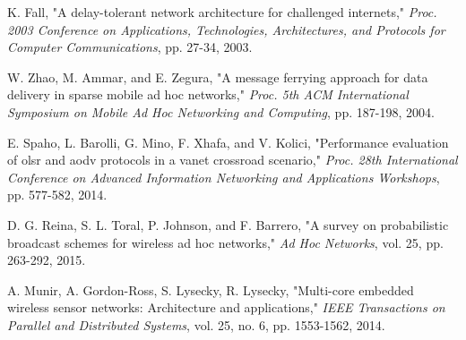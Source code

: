 \documentclass[conference]{IEEEtran}
\begin{document}
\begin{thebibliography}{00}
 K. Fall, "A delay-tolerant network architecture for challenged internets," \textit{Proc. 2003 Conference on Applications, Technologies, Architectures, and Protocols for Computer Communications}, pp. 27-34, 2003.

 W. Zhao, M. Ammar, and E. Zegura, "A message ferrying approach for data delivery in sparse mobile ad hoc networks," \textit{Proc. 5th ACM International Symposium on Mobile Ad Hoc Networking and Computing}, pp. 187-198, 2004.

 E. Spaho, L. Barolli, G. Mino, F. Xhafa, and V. Kolici, "Performance evaluation of olsr and aodv protocols in a vanet crossroad scenario," \textit{Proc. 28th International Conference on Advanced Information Networking and Applications Workshops}, pp. 577-582, 2014.

 D. G. Reina, S. L. Toral, P. Johnson, and F. Barrero, "A survey on probabilistic broadcast schemes for wireless ad hoc networks," \textit{Ad Hoc Networks}, vol. 25, pp. 263-292, 2015.

 A. Munir, A. Gordon-Ross, S. Lysecky, R. Lysecky, "Multi-core embedded wireless sensor networks: Architecture and applications," \textit{IEEE Transactions on Parallel and Distributed Systems}, vol. 25, no. 6, pp. 1553-1562, 2014.

\end{thebibliography}
\end{document}
